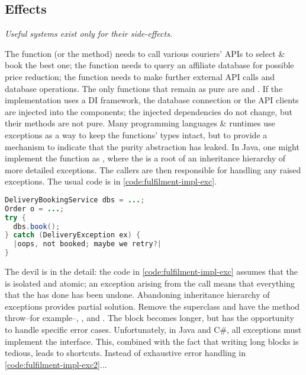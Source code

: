 \documentclass[10 pt, twocolumn]{article}
\begin{document}
\subsection{Effects}
\emph{Useful systems exist only for their side-effects.}

The  function (or the  method) needs to call various couriers' APIs to select \& book the best one; the  function needs to query an affiliate database for possible price reduction; the  function needs to make further external API calls and database operations. The only functions that remain as pure are  and . If the implementation uses a DI framework, the database connection or the API clients are injected into the components; the injected dependencies do not change, but their methods are not pure. Many programming languages \& runtimes use exceptions as a way to keep the functions' types intact, but to provide a mechanism to indicate that the purity abstraction has leaked. In Java, one might implement the  function as , where the  is a root of an inheritance hierarchy of more detailed exceptions. The callers are then responsible for handling any raised exceptions. The usual code is in \autoref{code:fulfilment-impl-exc}.

\begin{lstlisting}[caption={Exceptions}, label={code:fulfilment-impl-exc}, language=Java, escapechar=|]
DeliveryBookingService dbs = ...;
Order o = ...;
try {
  dbs.book();
} catch (DeliveryException ex) {
  |oops, not booked; maybe we retry?|
}
\end{lstlisting}

The devil is in the detail: the code in \autoref{code:fulfilment-impl-exc} assumes that the  is isolated and atomic; an exception arising from the call means that everything that the  has done has been undone. Abandoning inheritance hierarchy of exceptions provides partial solution. Remove the  superclass and have the method throw--for example--, , and . The  block becomes longer, but has the opportunity to handle specific error cases. Unfortunately, in Java and C\#, all exceptions must implement the  interface. This, combined with the fact that writing long  blocks is tedious, leads to shortcuts. Instead of exhaustive error handling in \autoref{code:fulfilment-impl-exc2}...
\end{document}
